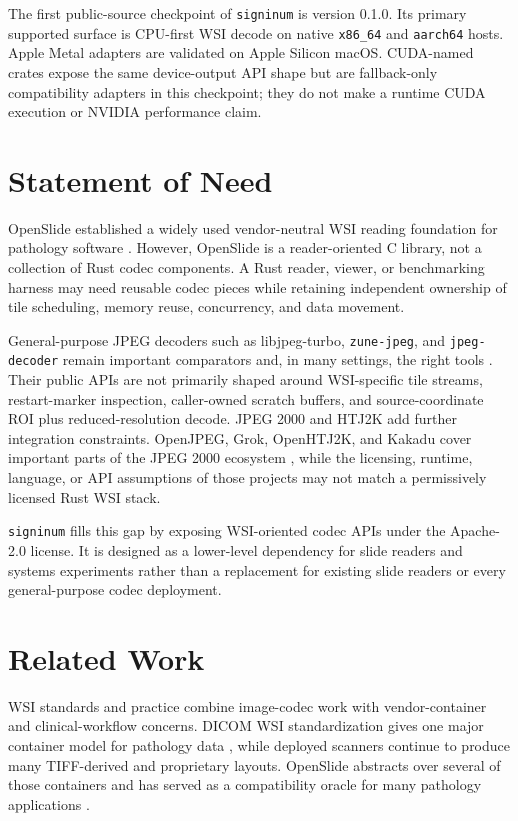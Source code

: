 \documentclass[11pt]{article}
\newcommand{\signinum}{\texttt{signinum}}
\newcommand{\crate}[1]{\texttt{#1}}
\begin{document}
The first public-source checkpoint of \signinum{} is version 0.1.0. Its primary
supported surface is CPU-first WSI decode on native \texttt{x86\_64} and
\texttt{aarch64} hosts. Apple Metal adapters are validated on Apple Silicon
macOS. CUDA-named crates expose the same device-output API shape but are
fallback-only compatibility adapters in this checkpoint; they do not make a
runtime CUDA execution or NVIDIA performance claim.

\section{Statement of Need}

OpenSlide established a widely used vendor-neutral WSI reading foundation for
pathology software \citep{goode2013openslide}. However, OpenSlide is a
reader-oriented C library, not a collection of Rust codec components. A Rust
reader, viewer, or benchmarking harness may need reusable codec pieces while
retaining independent ownership of tile scheduling, memory reuse, concurrency,
and data movement.

General-purpose JPEG decoders such as libjpeg-turbo, \crate{zune-jpeg}, and
\crate{jpeg-decoder} remain important comparators and, in many settings, the
right tools \citep{libjpegturbo,zunejpeg,jpegdecoder}. Their public APIs are
not primarily shaped around WSI-specific tile streams, restart-marker
inspection, caller-owned scratch buffers, and source-coordinate ROI plus
reduced-resolution decode. JPEG 2000 and HTJ2K add further integration
constraints. OpenJPEG, Grok, OpenHTJ2K, and Kakadu cover important parts of
the JPEG 2000 ecosystem \citep{openjpeg,grok,openhtj2k,kakadu}, while the
licensing, runtime, language, or API assumptions of those projects may not
match a permissively licensed Rust WSI stack.

\signinum{} fills this gap by exposing WSI-oriented codec APIs under the
Apache-2.0 license. It is designed as a lower-level dependency for slide
readers and systems experiments rather than a replacement for existing slide
readers or every general-purpose codec deployment.

\section{Related Work}

WSI standards and practice combine image-codec work with vendor-container and
clinical-workflow concerns. DICOM WSI standardization gives one major
container model for pathology data \citep{dicomwsi}, while deployed scanners
continue to produce many TIFF-derived and proprietary layouts. OpenSlide
abstracts over several of those containers and has served as a compatibility
oracle for many pathology applications \citep{goode2013openslide}.
\end{document}
